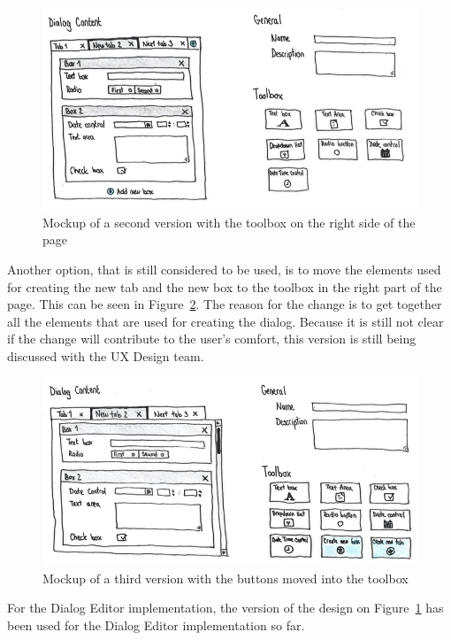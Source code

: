 \begin{figure}
  \centering
  \def\svgwidth{\columnwidth}
  \includegraphics[width=15cm,keepaspectratio]{fig/mockup-2}
  \caption{Mockup of a second version with the toolbox on the right side of the page}
  \label{fig:mockup-2}
\end{figure}

Another option, that is still considered to be used, is to move the
elements used for creating the new tab and the new box to the toolbox in the
right part of the page. This can be seen in Figure~\ref{fig:mockup-3}.
The reason for the change is to get together all the elements that are used for
creating the dialog.
Because it is still not clear if the change will contribute to the user's
comfort, this version is still being discussed with the UX Design team.

\begin{figure}
  \centering
  \def\svgwidth{\columnwidth}
  \includegraphics[width=15cm,keepaspectratio]{fig/mockup-3}
  \caption{Mockup of a third version with the buttons moved into the toolbox}
  \label{fig:mockup-3}
\end{figure}

For the Dialog Editor implementation, the version of the design on
Figure~\ref{fig:mockup-2} has been used for the Dialog Editor implementation
so far.

